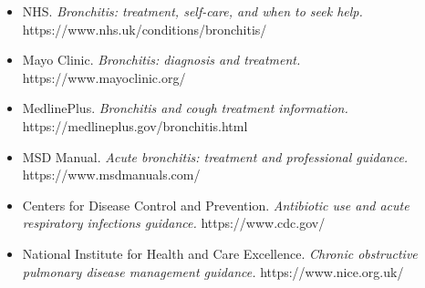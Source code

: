 \begin{itemize}
    \item NHS. \textit{Bronchitis: treatment, self-care, and when to seek help.} https://www.nhs.uk/conditions/bronchitis/
    \item Mayo Clinic. \textit{Bronchitis: diagnosis and treatment.} https://www.mayoclinic.org/
    \item MedlinePlus. \textit{Bronchitis and cough treatment information.} https://medlineplus.gov/bronchitis.html
    \item MSD Manual. \textit{Acute bronchitis: treatment and professional guidance.} https://www.msdmanuals.com/
    \item Centers for Disease Control and Prevention. \textit{Antibiotic use and acute respiratory infections guidance.} https://www.cdc.gov/
    \item National Institute for Health and Care Excellence. \textit{Chronic obstructive pulmonary disease management guidance.} https://www.nice.org.uk/
\end{itemize}
